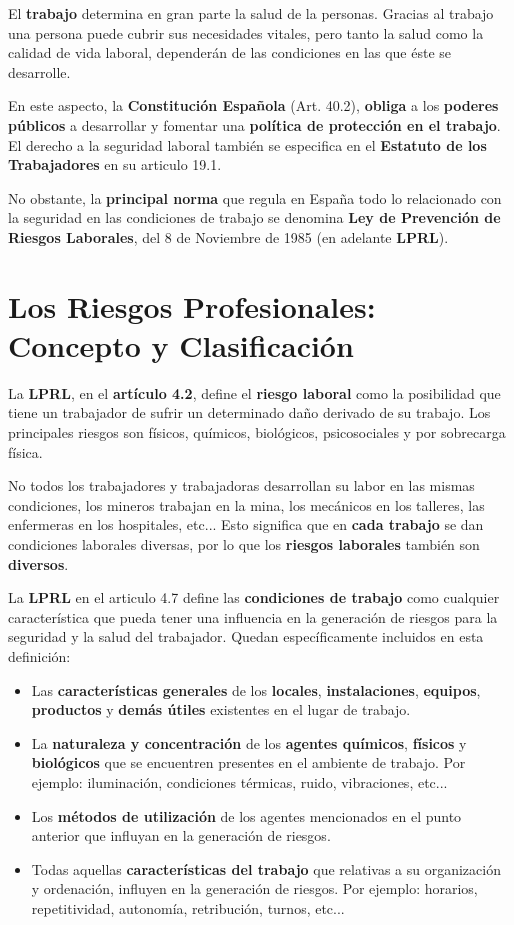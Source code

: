 El \textbf{trabajo} determina en gran parte la salud de la personas. Gracias al trabajo una persona puede cubrir sus necesidades vitales, pero tanto la salud como la calidad de vida laboral, dependerán de las condiciones en las que éste se desarrolle.

En este aspecto, la \textbf{Constitución Española} (Art. 40.2), \textbf{obliga} a los \textbf{poderes públicos} a desarrollar y fomentar una \textbf{política de protección en el trabajo}. El derecho a la seguridad laboral también se especifica en el \textbf{Estatuto de los Trabajadores} en su articulo 19.1.

No obstante, la \textbf{principal norma} que regula en España todo lo relacionado con la seguridad  en las condiciones de trabajo se denomina \textbf{Ley de Prevención de Riesgos Laborales}, del 8 de Noviembre de 1985 (en adelante \textbf{LPRL}).

\section{Los Riesgos Profesionales: Concepto y Clasificación}
La \textbf{LPRL}, en el \textbf{artículo 4.2}, define el \textbf{riesgo laboral} como la posibilidad que tiene un trabajador de sufrir un determinado daño derivado de su trabajo. Los principales riesgos son físicos, químicos, biológicos, psicosociales y por sobrecarga física.

No todos los trabajadores y trabajadoras desarrollan su labor en las mismas condiciones, los mineros trabajan en la mina, los mecánicos en los talleres, las enfermeras en los hospitales, etc... Esto significa que en \textbf{cada trabajo} se dan condiciones laborales diversas, por lo que los \textbf{riesgos laborales} también son \textbf{diversos}.

La \textbf{LPRL} en el articulo 4.7 define las \textbf{condiciones de trabajo} como cualquier característica que pueda tener una influencia en la generación de riesgos para la seguridad y la salud del trabajador. Quedan específicamente incluidos en esta definición:

\begin{itemize}
    \item Las \textbf{características generales} de los \textbf{locales}, \textbf{instalaciones}, \textbf{equipos}, \textbf{productos} y \textbf{demás útiles} existentes en el lugar de trabajo.
    \item La \textbf{naturaleza y concentración} de los \textbf{agentes químicos}, \textbf{físicos} y \textbf{biológicos} que se encuentren presentes en el ambiente de trabajo. Por ejemplo: iluminación, condiciones térmicas, ruido, vibraciones, etc...
    \item Los \textbf{métodos de utilización} de los agentes mencionados en el punto anterior que influyan en la generación de riesgos.
    \item Todas aquellas \textbf{características del trabajo} que relativas a su organización y ordenación, influyen en la generación de riesgos. Por ejemplo: horarios, repetitividad, autonomía, retribución, turnos, etc...
\end{itemize}

